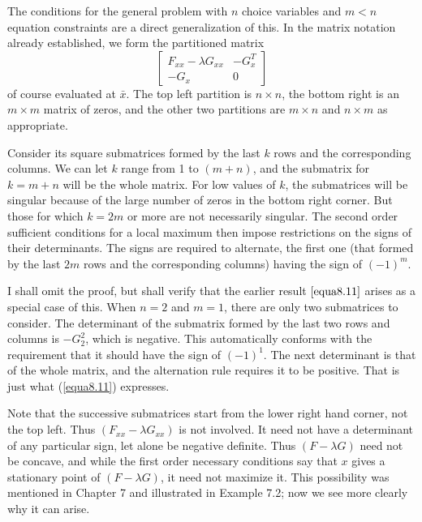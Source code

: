 The conditions for the general problem with $n$ choice variables and $m<n$ equation constraints are a direct generalization of this. In the matrix notation already established, we form the partitioned matrix
\begin{equation*}  
\left[ 
\begin{array}{cc}
F_{xx} -\lambda G_{xx} &  - G_x^T \\
-G_x  &  0
\end{array}  
\right]
\end{equation*}
of course evaluated at $\bar{x}$. The top left partition is $n \times n$, the bottom right is an $m \times m$ matrix of zeros, and the other two partitions are $m \times n$ and $n \times m$ as appropriate.

Consider its square submatrices formed by the last $k$ rows and the corresponding columns. We can let $k$ range from 1 to $(m+n)$, and the submatrix for $k=m+n$ will be the whole matrix. For low values of $k$, the submatrices will be singular because of the large number of zeros in the bottom right corner. But those for which $k=2m$ or more are not necessarily singular. The second order sufficient conditions for a local maximum then impose restrictions on the signs of their determinants. The signs are required to alternate, the first one (that formed by the last $2m$ rows and the corresponding columns) having the sign of $(-1)^m$.

I shall omit the proof, but shall verify that the earlier result $\ref{equa8.11}$ arises as a special case of this. When $n=2$ and $m=1$, there are only two submatrices to consider. The determinant of the submatrix formed by the last two rows and columns is $-G_2^2$, which is negative. This automatically conforms with the requirement that it should have the sign of $(-1)^1$. The next determinant is that of the whole matrix, and the alternation rule requires it to be positive. That is just what (\ref{equa8.11}) expresses.

Note that the successive submatrices start from the lower right hand corner, not the top left. Thus $(F_{xx} - \lambda G_{xx})$ is not involved. It need not have a determinant of any particular sign, let alone be negative definite. Thus $(F -\lambda G)$ need not be concave, and while the first order necessary conditions say that $x$ gives a stationary point of $(F - \lambda G)$, it need not maximize it. This possibility was mentioned
in Chapter 7 and illustrated in Example 7.2; now we see more clearly why it can arise.

